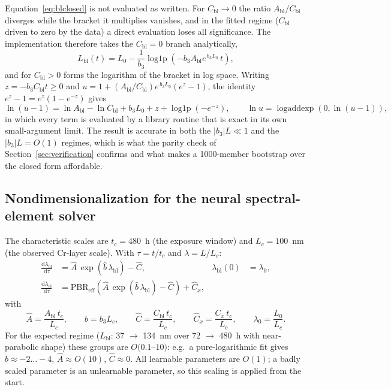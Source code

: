 Equation~\eqref{eq:blclosed} is not evaluated as written. For
$C_{\mathrm{bl}} \to 0$ the ratio $A_{\mathrm{bl}}/C_{\mathrm{bl}}$ diverges
while the bracket it multiplies vanishes, and in the fitted regime
($C_{\mathrm{bl}}$ driven to zero by the data) a direct evaluation loses all
significance. The implementation therefore takes the $C_{\mathrm{bl}} = 0$
branch analytically,
\begin{equation}
L_{\mathrm{bl}}(t) = L_0 - \frac{1}{b_3}
\operatorname{log1p}\!\left(-b_3 A_{\mathrm{bl}} e^{\,b_3 L_0}\, t\right) ,
\end{equation}
and for $C_{\mathrm{bl}} > 0$ forms the logarithm of the bracket in log space.
Writing $z = -b_3 C_{\mathrm{bl}} t \ge 0$ and $u = 1 + (A_{\mathrm{bl}} /
C_{\mathrm{bl}})e^{\,b_3 L_0}(e^{z}-1)$, the identity
$e^{z} - 1 = e^{z}(1 - e^{-z})$ gives
\begin{equation}
\ln(u-1) = \ln A_{\mathrm{bl}} - \ln C_{\mathrm{bl}} + b_3 L_0 + z
+ \operatorname{log1p}\!\left(-e^{-z}\right) ,
\qquad
\ln u = \operatorname{logaddexp}(0, \ln(u-1)) ,
\end{equation}
in which every term is evaluated by a library routine that is exact in its own
small-argument limit. The result is accurate in both the $|b_3| L \ll 1$ and
the $|b_3| L = O(1)$ regimes, which is what the parity check of
Section~\ref{sec:verification} confirms and what makes a 1000-member bootstrap
over the closed form affordable.

\subsection{Nondimensionalization for the neural spectral-element solver}
\label{sec:nondim}

The characteristic scales are $t_c = 480$~h (the exposure window) and
$L_c = 100$~nm (the observed Cr-layer scale). With $\tau = t/t_c$ and
$\lambda = L/L_c$:
\begin{align}
\frac{\mathrm{d}\lambda_{\mathrm{bl}}}{\mathrm{d}\tau}
&= \hat{A}\, \exp( \hat{b}\, \lambda_{\mathrm{bl}} ) - \hat{C} ,
& \lambda_{\mathrm{bl}}(0) &= \lambda_0 , \\
\frac{\mathrm{d}\lambda_{\mathrm{ol}}}{\mathrm{d}\tau}
&= \mathrm{PBR}_{\mathrm{eff}}
\left( \hat{A}\, \exp( \hat{b}\, \lambda_{\mathrm{bl}} ) - \hat{C} \right)
+ \hat{C}_x ,
\end{align}
with
\begin{equation}
\hat{A} = \frac{A_{\mathrm{bl}}\, t_c}{L_c} , \qquad
\hat{b} = b_3 L_c , \qquad
\hat{C} = \frac{C_{\mathrm{bl}}\, t_c}{L_c} , \qquad
\hat{C}_x = \frac{C_x\, t_c}{L_c} , \qquad
\lambda_0 = \frac{L_0}{L_c} .
\end{equation}
For the expected regime ($L_{\mathrm{bl}}$: 37 $\to$ 134~nm over 72 $\to$
480~h with near-parabolic shape) these groups are $O(0.1$--$10)$: e.g.\ a
pure-logarithmic fit gives $\hat{b} \approx -2 \ldots -4$,
$\hat{A} \approx O(10)$, $\hat{C} \approx 0$. All learnable parameters are $O(1)$; a badly scaled parameter is an unlearnable parameter, so this scaling is applied from the start.

